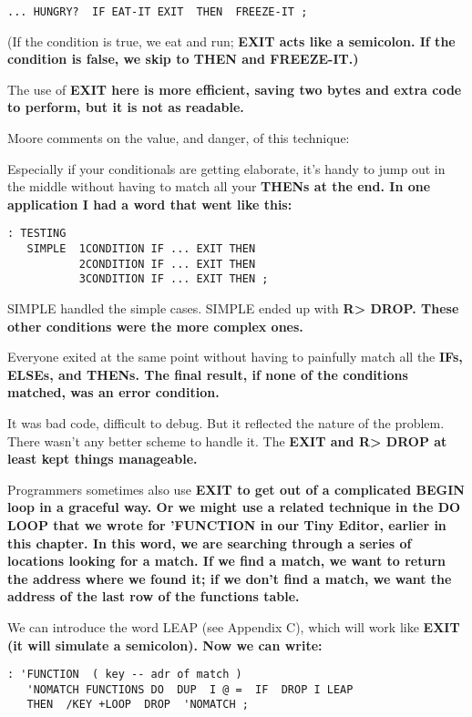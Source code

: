 \begin{verbatim}
... HUNGRY?  IF EAT-IT EXIT  THEN  FREEZE-IT ;
\end{verbatim}

(If the condition is true, we eat and run; \bf{EXIT} acts like a semicolon.
If the condition is false, we skip to \bf{THEN} and FREEZE-IT.)

The use of \bf{EXIT} here is more efficient, saving two bytes and extra
code to perform, but it is not as readable.

Moore comments on the value, and danger, of this technique:

Especially if your conditionals are getting elaborate, it's handy to jump out
in the middle without having to match all your \bf{THEN}s at the end. In one
application I had a word that went like this:

\begin{verbatim}
: TESTING
   SIMPLE  1CONDITION IF ... EXIT THEN
           2CONDITION IF ... EXIT THEN
           3CONDITION IF ... EXIT THEN ;
\end{verbatim}

SIMPLE handled the simple cases. SIMPLE ended up with \bf{R> DROP}.
These other conditions were the more complex ones.

Everyone exited at the same point without having to painfully match all
the \bf{IF}s, \bf{ELSE}s, and \bf{THEN}s. The final result, if none of the
conditions matched, was an error condition.

It was bad code, difficult to debug. But it reflected the nature of the
problem. There wasn't any better scheme to handle it. The \bf{EXIT} and
\bf{R> DROP} at least kept things manageable.

Programmers sometimes also use \bf{EXIT} to get out of a complicated
\bf{BEGIN} loop in a graceful way. Or we might use a related technique in the
\bf{DO LOOP} that we wrote for 'FUNCTION in our Tiny Editor, earlier in
this chapter. In this word, we are searching through a series of locations
looking for a match. If we find a match, we want to return the address
where we found it; if we don't find a match, we want the address of the
last row of the functions table.

We can introduce the word LEAP (see Appendix C), which will work
like \bf{EXIT} (it will simulate a semicolon). Now we can write:

\begin{verbatim}
: 'FUNCTION  ( key -- adr of match )
   'NOMATCH FUNCTIONS DO  DUP  I @ =  IF  DROP I LEAP
   THEN  /KEY +LOOP  DROP  'NOMATCH ;
\end{verbatim}

